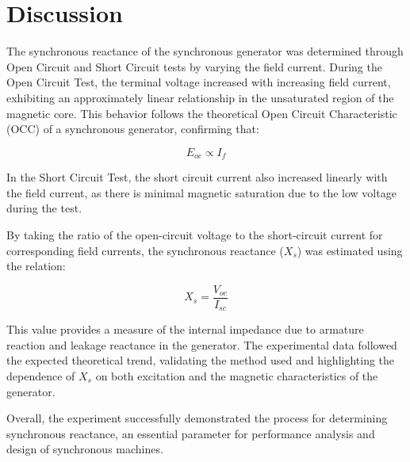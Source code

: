 \documentclass[a4paper,12pt]{article}
\begin{document}
\section{Discussion}

The synchronous reactance of the synchronous generator was determined through Open Circuit and Short Circuit tests by varying the field current. During the Open Circuit Test, the terminal voltage increased with increasing field current, exhibiting an approximately linear relationship in the unsaturated region of the magnetic core. This behavior follows the theoretical Open Circuit Characteristic (OCC) of a synchronous generator, confirming that:

\[
E_{oc} \propto I_f
\]

In the Short Circuit Test, the short circuit current also increased linearly with the field current, as there is minimal magnetic saturation due to the low voltage during the test. 

By taking the ratio of the open-circuit voltage to the short-circuit current for corresponding field currents, the synchronous reactance ($X_s$) was estimated using the relation:

\[
X_s = \frac{V_{oc}}{I_{sc}}
\]

This value provides a measure of the internal impedance due to armature reaction and leakage reactance in the generator. The experimental data followed the expected theoretical trend, validating the method used and highlighting the dependence of $X_s$ on both excitation and the magnetic characteristics of the generator.

Overall, the experiment successfully demonstrated the process for determining synchronous reactance, an essential parameter for performance analysis and design of synchronous machines.

	
\end{document}

